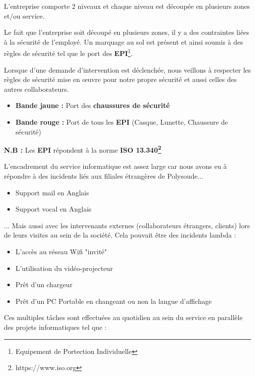 \documentclass[11pt,a4paper,oneside]{article}
\begin{document}
L'entreprise comporte 2 niveaux et chaque niveau est découpée en plusieurs zones et/ou service.

Le fait que l'entreprise soit découpé en plusieurs zones, il y a des contraintes liées à la sécurité de l'employé. Un marquage au sol est présent et ainsi soumis à des règles de sécurité tel que le port des \textbf{EPI}\footnote{Equipement de Portection Individuelle}.

Lorsque d'une demande d'intervention est déclenchée, nous veillons à respecter les règles de sécurité mise en \oe{}uvre pour notre propre sécurité et aussi celles des autres collaborateurs.\\
\begin{itemize}
    \item \textbf{Bande jaune :} Port des \textbf{chaussures de sécurité}
    \item \textbf{Bande rouge :} Port de tous les \textbf{EPI} (Casque, Lunette, Chaussure de sécurité)
\end{itemize}

\begin{center}
    \textbf{N.B :} Les \textbf{EPI} répondent à la norme \textbf{ISO 13.340\footnote{https://www.iso.org}}
\end{center}

L'encadrement du service informatique est assez large car nous avons eu à répondre à des incidents liés aux filiales étrangères de Polysoude...

\begin{itemize}
    \item Support mail en Anglais
    \item Support vocal en Anglais \\
\end{itemize}

... Mais aussi avec les intervenants externes (collaborateurs étrangers, clients) lors de leurs visites au sein de la société. Cela pouvait être des incidents lambda :

\begin{itemize}
    \item L'accès au réseau Wifi "invité"
    \item L'utilisation du vidéo-projecteur
    \item Prêt d'un chargeur 
    \item Prêt d'un PC Portable en changeant ou non la langue d'affichage
\end{itemize}

Ces multiples tâches sont effectuées au quotidien au sein du service en parallèle des projets informatiques tel que :
\end{document}

